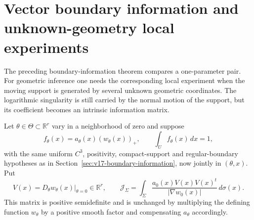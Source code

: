\section{Vector boundary information and unknown-geometry local experiments}
\label{sec:v19-vector-information}

The preceding boundary-information theorem compares a one-parameter pair.
For geometric inference one needs the corresponding local experiment when
the moving support is generated by several unknown geometric coordinates.
The logarithmic singularity is still carried by the normal motion of the
support, but its coefficient becomes an intrinsic information matrix.

Let $\theta\in\Theta\subset\mathbb R^r$ vary in a neighborhood of zero and
suppose
\begin{equation}\label{eq:v19-vector-density}
 f_\theta(x)=a_\theta(x)(w_\theta(x))_+,
 \qquad \int_U f_\theta(x)\,dx=1,
\end{equation}
with the same uniform $C^3$, positivity, compact-support and
regular-boundary hypotheses as in
Section~\ref{sec:v17-boundary-information}, now jointly in $(\theta,x)$.
Put
\begin{equation}\label{eq:v19-boundary-information-matrix}
 V(x)=D_\theta w_\theta(x)|_{\theta=0}\in\mathbb R^r,
 \qquad
 \mathcal J_\Sigma=
 \int_\Sigma\frac{a_0(x)V(x)V(x)^t}{|\nabla w_0(x)|}\,d\sigma(x).
\end{equation}
This matrix is positive semidefinite and is unchanged by multiplying the
defining function $w_\theta$ by a positive smooth factor and compensating
$a_\theta$ accordingly.

